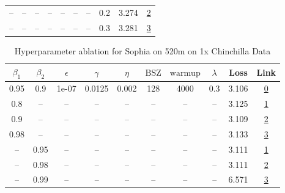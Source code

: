 \begin{table}[H]
\begin{tabular}{cccccccccc}
-- & -- & -- & -- & -- & -- & -- & 0.2 & 3.274 & \href{https://wandb.ai/marin-community/optimizer-scaling/runs/sweep-300m-6B-sophiaf66c842lr0.004-wd0.2-minlr0-warmup4000-b10.9-cd3965}{2} \\
-- & -- & -- & -- & -- & -- & -- & 0.3 & 3.281 & \href{https://wandb.ai/marin-community/optimizer-scaling/runs/sweep-300m-6B-sophiabcf6b6lr0.004-wd0.3-minlr0-warmup4000-b10.9--8f044b}{3} \\
\bottomrule
\end{tabular}
\end{table}

\begin{table}[H]
\centering
\caption{Hyperparameter ablation for Sophia on 520m on 1x Chinchilla Data}
\label{tab:ablation_sophia_520m_on_1x_chinchilla_data}
\begin{tabular}{cccccccccc}
\toprule
$\beta_1$ & $\beta_2$ & $\epsilon$ & $\gamma$ & $\eta$ & $\mathrm{BSZ}$ & $\mathrm{warmup}$ & $\lambda$ & Loss & Link \\
\midrule
0.95 & 0.9 & 1e-07 & 0.0125 & 0.002 & 128 & 4000 & 0.3 & 3.106 & \href{https://wandb.ai/marin-community/optimizer-scaling/runs/sweep-520m-10B-sophia651c9blr0.002-wd0.3-minlr0-warmup4000-b10.9-46bf7a}{0} \\
\midrule
0.8 & -- & -- & -- & -- & -- & -- & -- & 3.125 & \href{https://wandb.ai/marin-community/optimizer-scaling/runs/sweep-520m-10B-sophiaded744lr0.002-wd0.3-minlr0-warmup4000-b10.8-48fa58}{1} \\
0.9 & -- & -- & -- & -- & -- & -- & -- & 3.109 & \href{https://wandb.ai/marin-community/optimizer-scaling/runs/sweep-520m-10B-sophiaed133clr0.002-wd0.3-minlr0-warmup4000-b10.9-5c6e5d}{2} \\
0.98 & -- & -- & -- & -- & -- & -- & -- & 3.133 & \href{https://wandb.ai/marin-community/optimizer-scaling/runs/sweep-520m-10B-sophia573a3clr0.002-wd0.3-minlr0-warmup4000-b10.9-b85ec2}{3} \\
-- & 0.95 & -- & -- & -- & -- & -- & -- & 3.111 & \href{https://wandb.ai/marin-community/optimizer-scaling/runs/sweep-520m-10B-sophiad6af81lr0.002-wd0.3-minlr0-warmup4000-b10.9-529318}{1} \\
-- & 0.98 & -- & -- & -- & -- & -- & -- & 3.111 & \href{https://wandb.ai/marin-community/optimizer-scaling/runs/sweep-520m-10B-sophia216d9elr0.002-wd0.3-minlr0-warmup4000-b10.9-9d3974}{2} \\
-- & 0.99 & -- & -- & -- & -- & -- & -- & 6.571 & \href{https://wandb.ai/marin-community/optimizer-scaling/runs/sweep-520m-10B-sophia96c899lr0.002-wd0.3-minlr0-warmup4000-b10.9-44bd90}{3} \\

\end{tabular}
\end{table}

